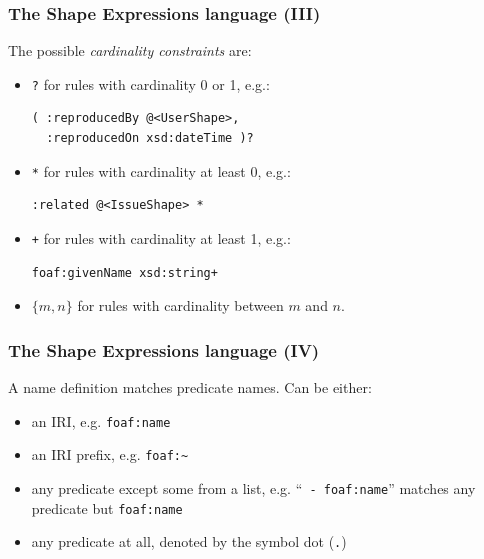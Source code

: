 \documentclass{beamer}
\begin{document}
\begin{frame}[fragile]
  \frametitle{The Shape Expressions language (III)}

  The possible \textit{cardinality constraints} are:

  \pause

  \begin{itemize}
    \item \texttt{?} for rules with cardinality 0 or 1, e.g.:

    \begin{Verbatim}
( :reproducedBy @<UserShape>,
  :reproducedOn xsd:dateTime )?
    \end{Verbatim}

    \pause

    \item \texttt{*} for rules with cardinality at least 0, e.g.:

    \begin{Verbatim}
:related @<IssueShape> *
    \end{Verbatim}

    \pause

    \item \texttt{+} for rules with cardinality at least 1, e.g.:

    \begin{Verbatim}
foaf:givenName xsd:string+
    \end{Verbatim}

    \pause

    \item \texttt{$\{m, n\}$} for rules with cardinality between $m$ and $n$.

  \end{itemize}
\end{frame}

\begin{frame}[fragile]
  \frametitle{The Shape Expressions language (IV)}

  A name definition matches predicate names. Can be either:

  \begin{itemize}
    \item an IRI, e.g. \texttt{foaf:name}

    \pause

    \item an IRI prefix, e.g. \texttt{foaf:\~}

    \pause

    \item any predicate except some from a list, e.g.
      ``\texttt{ - foaf:name}'' matches any predicate but \texttt{foaf:name}

    \pause

    \item any predicate at all, denoted by the symbol dot (\texttt{.})
  \end{itemize}
\end{frame}
\end{document}
